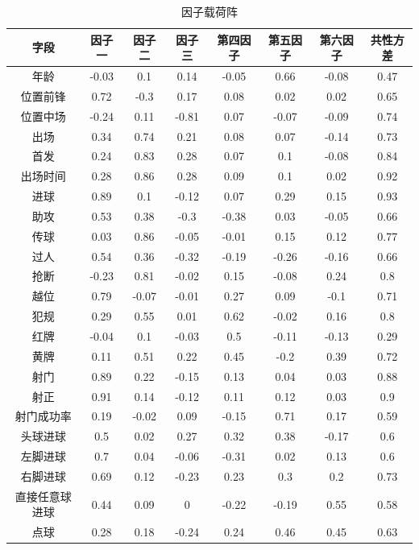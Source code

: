 \documentclass[12pt,a4paper,onecolumn]{article}
\begin{document}
\begin{table}[H]
\centering
\caption{因子载荷阵}
\begin{tabular}{cccccccc}
  \hline
    字段 & 因子一 & 因子二 & 因子三 & 第四因子 & 第五因子 & 第六因子 & 共性方差 \\\hline
		年龄&-0.03 & 0.1 & 0.14 & -0.05 & 0.66 & -0.08 & 0.47 \\
		位置前锋 & 0.72 & -0.3 & 0.17 & 0.08 & 0.02 & 0.02 & 0.65 \\
		位置中场 & -0.24 & 0.11 & -0.81 & 0.07 & -0.07 & -0.09 & 0.74 \\
		出场 & 0.34 & 0.74 & 0.21 & 0.08 & 0.07 & -0.14 & 0.73 \\
		首发 & 0.24 & 0.83 & 0.28 & 0.07 & 0.1 & -0.08 & 0.84 \\
		出场时间 & 0.28 & 0.86 & 0.28 & 0.09 & 0.1 & 0.02 & 0.92 \\
		进球 & 0.89 & 0.1 & -0.12 & 0.07 & 0.29 & 0.15 & 0.93 \\
		助攻 & 0.53 & 0.38 & -0.3 & -0.38 & 0.03 & -0.05 & 0.66 \\
		传球 & 0.03 & 0.86 & -0.05 & -0.01 & 0.15 & 0.12 & 0.77 \\
		过人 & 0.54 & 0.36 & -0.32 & -0.19 & -0.26 & -0.16 & 0.66 \\
		抢断 & -0.23 & 0.81 & -0.02 & 0.15 & -0.08 & 0.24 & 0.8 \\
		越位 & 0.79 & -0.07 & -0.01 & 0.27 & 0.09 & -0.1 & 0.71 \\
		犯规 & 0.29 & 0.55 & 0.01 & 0.62 & -0.02 & 0.16 & 0.8 \\
		红牌 & -0.04 & 0.1 & -0.03 & 0.5 & -0.11 & -0.13 & 0.29 \\
		黄牌 & 0.11 & 0.51 & 0.22 & 0.45 & -0.2 & 0.39 & 0.72 \\
		射门 & 0.89 & 0.22 & -0.15 & 0.13 & 0.04 & 0.03 & 0.88 \\
		射正 & 0.91 & 0.14 & -0.12 & 0.11 & 0.12 & 0.03 & 0.9 \\
		射门成功率 & 0.19 & -0.02 & 0.09 & -0.15 & 0.71 & 0.17 & 0.59 \\
		头球进球 & 0.5 & 0.02 & 0.27 & 0.32 & 0.38 & -0.17 & 0.6 \\
		左脚进球 & 0.7 & 0.04 & -0.06 & -0.31 & 0.02 & 0.13 & 0.6 \\
		右脚进球 & 0.69 & 0.12 & -0.23 & 0.23 & 0.3 & 0.2 & 0.73 \\
		直接任意球进球 & 0.44 & 0.09 & 0 & -0.22 & -0.19 & 0.55 & 0.58 \\
		点球 & 0.28 & 0.18 & -0.24 & 0.24 & 0.46 & 0.45 & 0.63 \\

\end{tabular}
\end{table}
\end{document}
